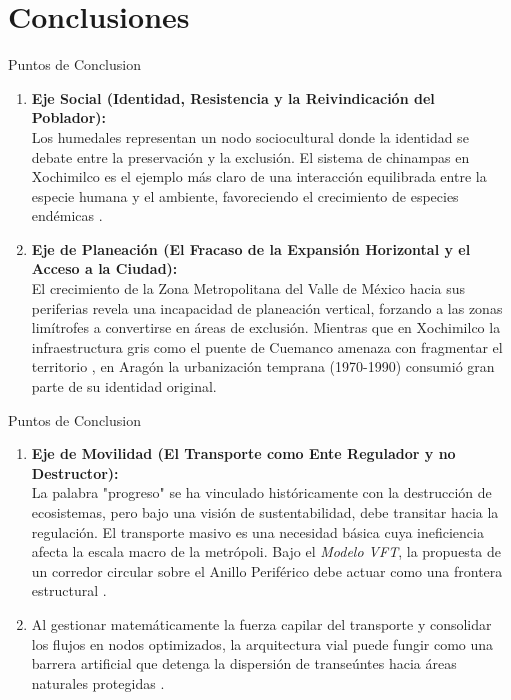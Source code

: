 
\section{Conclusiones}

\begin{frame}{Puntos de Conclusion}
  \begin{enumerate}
    \item \textbf{Eje Social (Identidad, Resistencia y la Reivindicación del Poblador):} \\
          Los humedales representan un nodo sociocultural donde la identidad se debate entre la preservación y la exclusión. 
          El sistema de chinampas en Xochimilco es el ejemplo más claro de una interacción equilibrada entre la especie humana 
          y el ambiente, favoreciendo el crecimiento de especies endémicas \cite{paot2006xochimilco}.
    \item \textbf{Eje de Planeación (El Fracaso de la Expansión Horizontal y el Acceso a la Ciudad): } \\
          El crecimiento de la Zona Metropolitana del Valle de México hacia sus periferias revela una incapacidad de planeación vertical, 
          forzando a las zonas limítrofes a convertirse en áreas de exclusión. Mientras que en Xochimilco la infraestructura gris como el puente de 
          Cuemanco amenaza con fragmentar el territorio \cite{segob2020proposicion}, 
          en Aragón la urbanización temprana (1970-1990) consumió gran parte de su identidad original.
  \end{enumerate}
\end{frame}

\begin{frame}{Puntos de Conclusion}
  \begin{enumerate}
    \item \textbf{Eje de Movilidad (El Transporte como Ente Regulador y no Destructor):} \\
          La palabra "progreso" se ha vinculado históricamente con la destrucción de ecosistemas, pero bajo una visión de sustentabilidad, 
          debe transitar hacia la regulación. El transporte masivo es una necesidad básica cuya ineficiencia afecta la escala macro de la metrópoli. 
          Bajo el \textit{Modelo VFT}, la propuesta de un corredor circular sobre el Anillo Periférico debe actuar como una frontera estructural \cite{garibaldi2023vft}. 
    \item Al gestionar matemáticamente la fuerza capilar del transporte y consolidar los flujos en nodos optimizados, la arquitectura vial puede fungir como una barrera 
          artificial que detenga la dispersión de transeúntes hacia áreas naturales protegidas \cite{garibaldi2023vft}.
  \end{enumerate}
\end{frame}

